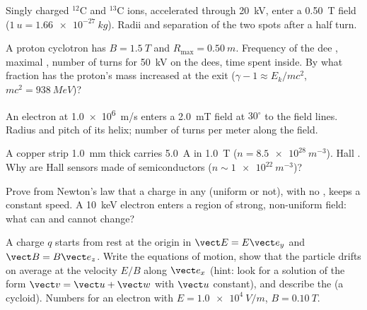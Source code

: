 \begin{exercise}[$\star\star$]\label{exo:b1:charged-particles:6}
Singly charged $^{12}$C and $^{13}$C ions, accelerated through
\qty{20}{kV}, enter a \qty{0.50}{T} field ($\qty{1}{u} = \qty{1.66e-27}{kg}$).
Radii and separation of the two spots after a half turn.
\end{exercise}

\begin{exercise}[$\star\star$]\label{exo:b1:charged-particles:7}
A proton cyclotron has $B = \qty{1.5}{T}$ and $R_{\max} = \qty{0.50}{m}$.
Frequency of the dee , maximal , number of turns
for \qty{50}{kV} on the dees, time spent inside. By what fraction has
the proton's mass increased at the exit ($\gamma - 1 \approx E_k/mc^2$,
$mc^2 = \qty{938}{MeV}$)?
\end{exercise}

\begin{exercise}[$\star\star$]\label{exo:b1:charged-particles:8}
An electron at \qty{1.0e6}{m/s} enters a \qty{2.0}{mT} field at $30^\circ$
to the field lines. Radius and pitch of its helix; number of turns per
meter along the field.
\end{exercise}

\begin{exercise}[$\star\star$]\label{exo:b1:charged-particles:9}
A copper strip \qty{1.0}{mm} thick carries \qty{5.0}{A} in \qty{1.0}{T}
($n = \qty{8.5e28}{m^{-3}}$). Hall . Why are Hall sensors made of
semiconductors ($n \sim \qty{1e22}{m^{-3}}$)?
\end{exercise}

\begin{exercise}[$\star\star\star$]\label{exo:b1:charged-particles:10}
Prove from Newton's law that a charge in any  (uniform or
not), with no , keeps a constant speed. A \qty{10}{keV}
electron enters a region of strong, non-uniform field: what can and
cannot change?
\end{exercise}

\begin{exercise}[$\star\star\star$]\label{exo:b1:charged-particles:11}
A charge $q$ starts from rest at the origin in $\vect E = E\vect e_y$ and
$\vect B = B\vect e_z$. Write the equations of motion, show that the
particle drifts on average at the velocity $E/B$ along $\vect e_x$
(hint: look for a solution of the form $\vect v = \vect u + \vect w$ with
$\vect u$ constant), and describe the  (a cycloid). Numbers for
an electron with $E = \qty{1.0e4}{V/m}$, $B = \qty{0.10}{T}$.
\end{exercise}

